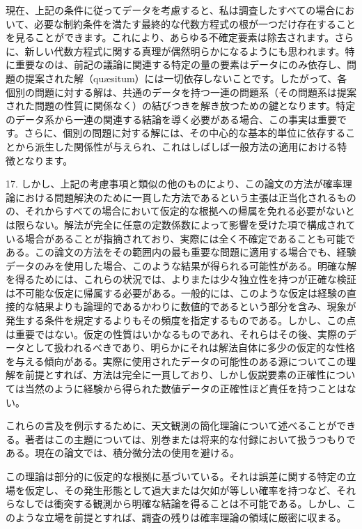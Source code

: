 \documentclass[a4paper,11pt,openany]{ltjsbook}
\begin{document}
現在、上記の条件に従ってデータを考慮すると、私は調査したすべての場合において、必要な制約条件を満たす最終的な代数方程式の根が一つだけ存在することを見ることができます。これにより、あらゆる不確定要素は除去されます。さらに、新しい代数方程式に関する真理が偶然明らかになるようにも思われます。特に重要なのは、前記の議論に関連する特定の量の要素はデータにのみ依存し、問題の提案された解（qu\ae{}situm）には一切依存しないことです。したがって、各個別の問題に対する解は、共通のデータを持つ一連の問題系（その問題系は提案された問題の性質に関係なく）の結びつきを解き放つための鍵となります。特定のデータ系から一連の関連する結論を導く必要がある場合、この事実は重要です。さらに、個別の問題に対する解には、その中心的な基本的単位に依存することから派生した関係性が与えられ、これはしばしば一般方法の適用における特徴となります。

17. しかし、上記の考慮事項と類似の他のものにより、この論文の方法が確率理論における問題解決のために一貫した方法であるという主張は正当化されるものの、それからすべての場合において仮定的な根拠への帰属を免れる必要がないとは限らない。解法が完全に任意の定数係数によって影響を受けた項で構成されている場合があることが指摘されており、実際には全く不確定であることも可能である。この論文の方法をその範囲内の最も重要な問題に適用する場合でも、経験データのみを使用した場合、このような結果が得られる可能性がある。明確な解を得るためには、これらの状況では、よりまたは少々独立性を持つが正確な検証は不可能な仮定に帰属する必要がある。一般的には、このような仮定は経験の直接的な結果よりも論理的であるかわりに数値的であるという部分を含み、現象が発生する条件を規定するよりもその頻度を指定するものである。しかし、この点は重要ではない。仮定の性質はいかなるものであれ、それらはその後、実際のデータとして扱われるべきであり、明らかにそれは解法自体に多少の仮定的な性格を与える傾向がある。実際に使用されたデータの可能性のある源についてこの理解を前提とすれば、方法は完全に一貫しており、しかし仮説要素の正確性については当然のように経験から得られた数値データの正確性ほど責任を持つことはない。

これらの言及を例示するために、天文観測の簡化理論について述べることができる。著者はこの主題については、別巻または将来的な付録において扱うつもりである。現在の論文では、積分微分法の使用を避ける。

この理論は部分的に仮定的な根拠に基づいている。それは誤差に関する特定の立場を仮定し、その発生形態として過大または欠如が等しい確率を持つなど、それらなしでは衝突する観測から明確な結論を得ることは不可能である。しかし、このような立場を前提とすれば、調査の残りは確率理論の領域に厳密に収まる。
\end{document}

